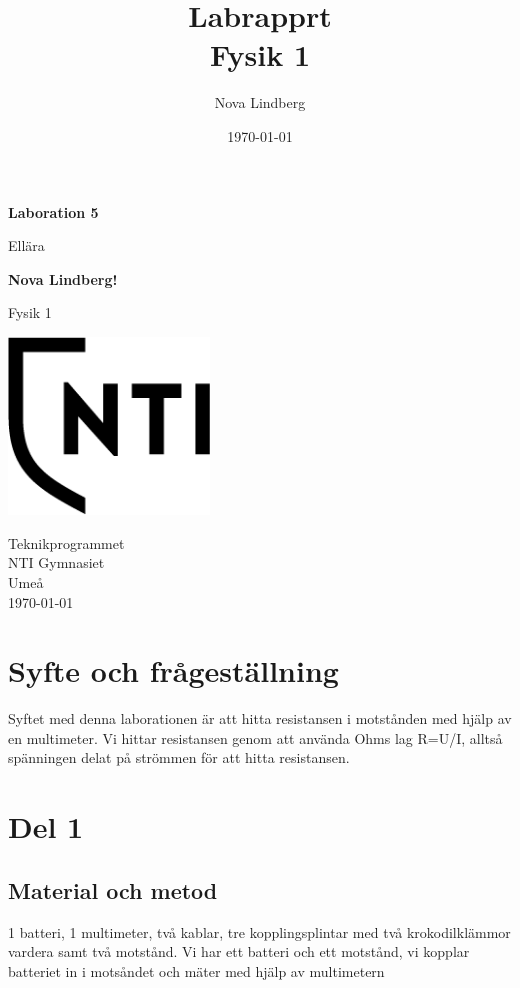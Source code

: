 \documentclass[11p]{article}
\title{Labrapprt \\ \small Fysik 1}
\author{Nova Lindberg }
\date{\today}
\begin{document}
    \begin{titlepage}
        \begin{center}
            \vspace*{1cm}

            \Huge
            \textbf{Laboration 5}

            \vspace{0.5cm}
            \LARGE
            Ellära

            \vspace{1.5cm}

            \textbf{Nova Lindberg!}

            \vfill


            Fysik 1

            \vspace{0.8cm}

            \includegraphics[width=0.4\textwidth]{../images/NTI.png}

            \Large
            Teknikprogrammet\\
            NTI Gymnasiet\\
            Umeå\\
            \today

        \end{center}
    \end{titlepage}
    \section{Syfte och frågeställning}
    Syftet med denna laborationen är att hitta resistansen i motstånden med hjälp av en multimeter. Vi hittar resistansen genom att använda Ohms lag R=U/I, alltså spänningen delat på strömmen för att hitta resistansen.
    \section{Del 1}
    \subsection{Material och metod}
    1 batteri, 1 multimeter, två kablar, tre kopplingsplintar med två krokodilklämmor vardera samt två motstånd.
    Vi har ett batteri och ett motstånd, vi kopplar batteriet in i motsåndet och mäter med hjälp av multimetern
\end{document}
